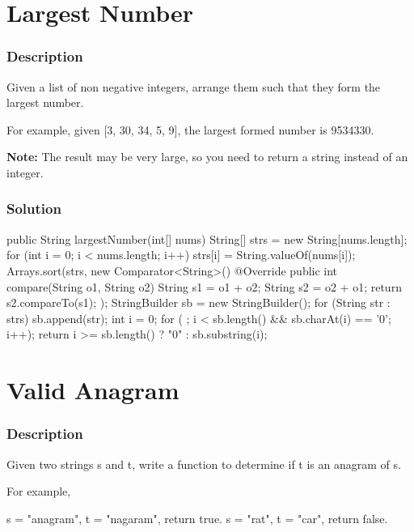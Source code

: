 \newpage

\section{Largest Number} %

\subsubsection{Description}
Given a list of non negative integers, arrange them such that they form the largest number.

For example, given [3, 30, 34, 5, 9], the largest formed number is 9534330.

\textbf{Note:} The result may be very large, so you need to return a string instead of an integer.

\subsubsection{Solution}

\begin{Code}
public String largestNumber(int[] nums) {
    String[] strs = new String[nums.length];
    for (int i = 0; i < nums.length; i++) {
        strs[i] = String.valueOf(nums[i]);
    }
    Arrays.sort(strs, new Comparator<String>() {
        @Override
        public int compare(String o1, String o2) {
            String s1 = o1 + o2;
            String s2 = o2 + o1;
            return s2.compareTo(s1);
        }
    });
    StringBuilder sb = new StringBuilder();
    for (String str : strs) {
        sb.append(str);
    }
    int i = 0;
    for ( ; i < sb.length() && sb.charAt(i) == '0'; i++);
    return i >= sb.length() ? "0" : sb.substring(i);
}
\end{Code}

\newpage

\section{Valid Anagram} %

\subsubsection{Description}
Given two strings s and t, write a function to determine if t is an anagram of s.

For example,
\begin{Code}
s = "anagram", t = "nagaram", return true.
s = "rat", t = "car", return false.
\end{Code}

